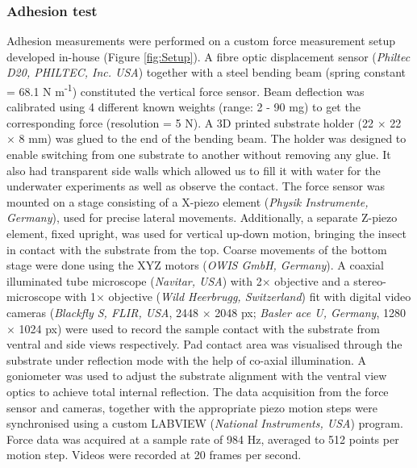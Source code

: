 \documentclass[vruler,JEB]{COB}%
\begin{document}
\subsubsection{Adhesion test}

Adhesion measurements were performed on a custom force measurement
setup developed in-house (Figure \ref{fig:Setup}). A fibre optic
displacement sensor (\emph{Philtec D20, PHILTEC, Inc. USA}) together
with a steel bending beam (spring constant = 68.1 N m\protect\textsuperscript{-1}) constituted
the vertical force sensor. Beam deflection was calibrated using 4
different known weights (range: 2 - 90 mg) to get the corresponding force (resolution = 5 \textmu N). A
3D printed substrate holder (22 $\times$ 22 $\times$ 8 mm) was glued to the end of the bending beam.
The holder was designed to enable switching from one substrate to
another without removing any glue. It also had transparent side walls
which allowed us to fill it with water for the underwater experiments
as well as observe the contact. The force sensor was mounted on a stage
consisting of a X-piezo element (\emph{Physik Instrumente, Germany}), used for precise lateral movements. Additionally, a separate Z-piezo element, fixed upright,
was used for vertical up-down motion, bringing the insect in contact
with the substrate from the top. Coarse movements of the bottom stage were done using the XYZ motors (\emph{OWIS GmbH, Germany}).
A coaxial illuminated tube microscope
(\emph{Navitar, USA}) with 2$\times$ objective and a stereo-microscope
with 1$\times$ objective (\emph{Wild Heerbrugg, Switzerland}) fit with digital video cameras 
(\emph{Blackfly S, FLIR, USA}, 2448 $\times$ 2048 px; \emph{Basler ace U, Germany}, 1280 $\times$ 1024 px)
were used to record the sample contact with the substrate from ventral
and side views respectively. Pad contact area was visualised through
the substrate under reflection mode with the help of co-axial illumination. A goniometer was used to adjust the substrate alignment
with the ventral view optics to achieve total internal reflection.
The data acquisition from the force sensor and cameras, together with
the appropriate piezo motion steps were synchronised using a custom
LABVIEW (\emph{National Instruments, USA}) program. Force data was acquired at a sample rate of 984 Hz,
averaged to 512 points per motion step. Videos were recorded at 20
frames per second. 
\end{document}
